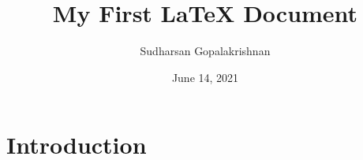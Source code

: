\documentclass{article}
\title{My First \LaTeX{} Document}
\author{Sudharsan Gopalakrishnan}
\date{June 14, 2021}
\begin{document}
    \maketitle

    \newpage

    \tableofcontents

    \newpage

    \section{Introduction}
\end{document}
